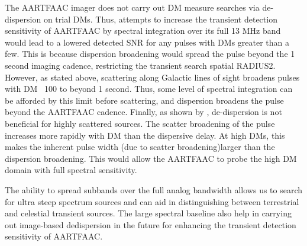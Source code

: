\documentclass[referee]{aa}
\begin{document}

The AARTFAAC imager does not carry  out DM measure searches via de-dispersion on
trial DMs.   Thus, attempts to  increase the transient detection  sensitivity of
AARTFAAC  by spectral integration  over its  full 13  MHz band  would lead  to a
lowered  detected SNR  for any  pulses with  DMs greater  than a  few.   This is
because dispersion broadening would spread the pulse beyond the 1 second imaging
cadence, restricting  the transient search  spatial RADIUS2. However,  as stated
above, scattering along Galactic lines of  sight broadens pulses with DM ~100 to
beyond 1  second. Thus, some  level of spectral  integration can be  afforded by
this  limit before  scattering, and  dispersion  broadens the  pulse beyond  the
AARTFAAC   cadence.    Finally,   as  shown   by   \citet{hassall2013detecting},
de-dispersion  is not  beneficial  for highly  scattered  sources.  The  scatter
broadening  of the  pulse increases  more rapidly  with DM  than  the dispersive
delay.   At high  DMs,  this makes  the  inherent pulse  width  (due to  scatter
broadening)larger than the dispersion  broadening. This would allow the AARTFAAC
to probe the high DM domain with full spectral sensitivity.

The  ability to  spread subbands  over the  full analog  bandwidth allows  us to
search for  ultra steep spectrum sources  and can aid  in distinguishing between
terrestrial and  celestial transient sources.  The large  spectral baseline also
help in  carrying out image-based dedispersion  in the future  for enhancing the
transient detection sensitivity of AARTFAAC.
\end{document}
